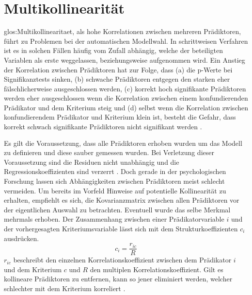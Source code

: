 \section{Multikollinearität}
\Gls{glos:Multikollinearitaet}, als hohe Korrelationen zwischen mehreren Prädiktoren, führt zu Problemen bei der automatischen Modellwahl. 
In schrittweisen Verfahren ist es in solchen Fällen häufig vom Zufall abhängig, welche der beteiligten Variablen als erste weggelassen, beziehungsweise aufgenommen wird. 
Ein Anstieg der Korrelation zwischen Prädiktoren hat zur Folge, dass (a) die p-Werte bei Signifikanztests sinken, (b) schwache Prädiktoren entgegen den starken eher fälschlicherweise ausgeschlossen werden, (c) korrekt hoch signifikante Prädiktoren werden eher ausgeschlossen wenn die Korrelation zwischen einem konfundierenden Prädikator und dem Kriterium steig und (d) selbst wenn die Korrelation zwischen konfundierendem Prädikator und Kriterium klein ist, besteht die Gefahr, dass korrekt schwach signifikante Prädiktoren nicht signifikant werden \cite[p. 2810]{graham2003confronting}.

Es gilt die Voraussetzung, dass alle Prädiktoren erhoben wurden um das Modell zu definieren und diese sauber gemessen wurden. Bei Verletzung dieser Voraussetzung sind die Residuen nicht unabhängig und die Regressionskoeffizienten sind verzerrt \cite[p. 119]{jacob2003applied}.
Doch gerade in der psychologischen Forschung lassen sich Abhängigkeiten zwischen Prädiktoren meist schlecht vermeiden.
Um bereits im Vorfeld Hinweise auf potentielle Kollinearität zu erhalten, empfiehlt es sich, die Kovarianzmatrix zwischen allen Prädiktoren vor der eigentlichen Auswahl zu betrachten.
Eventuell wurde das selbe Merkmal mehrmals erhoben.
Der Zusammenhang zwischen einer Prädikatorvariable $i$ und der vorhergesagten Kriteriumsvariable lässt sich mit dem Strukturkoeffizienten $c_i$ ausdrücken.
\begin{equation}
c_i = \frac{r_{ic}}{R}
\tag{Strukturkoeffizient}
\end{equation}
$r_{ic}$ beschreibt den einzelnen Korrelationskoeffizient zwischen dem Prädikator $i$ und dem Kriterium $c$ und $R$ den multiplen Korrelationskoeffizient. 
Gilt es kollineare Prädiktoren zu entfernen, kann so jener eliminiert werden, welcher schlechter mit dem Kriterium korreliert \cite[S. 453]{bortz2011}. 
